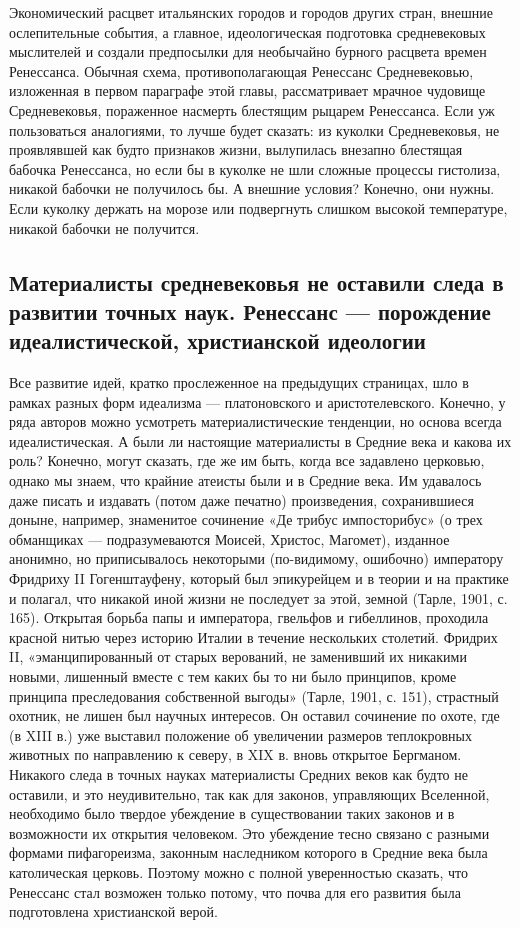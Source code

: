 Экономический расцвет итальянских городов и городов других стран,
внешние ослепительные события, а главное, идеологическая подготовка
средневековых мыслителей и создали предпосылки для необычайно бурного
расцвета времен Ренессанса. Обычная схема, противополагающая Ренессанс
Средневековью, изложенная в первом параграфе этой главы, рассматривает
мрачное чудовище Средневековья, пораженное насмерть блестящим рыцарем
Ренессанса. Если уж пользоваться аналогиями, то лучше будет сказать:
из куколки Средневековья, не проявлявшей как будто признаков жизни,
вылупилась внезапно блестящая бабочка Ренессанса, но если бы в куколке
не шли сложные процессы гистолиза, никакой бабочки не получилось бы. А
внешние условия? Конечно, они нужны. Если куколку держать на морозе
или подвергнуть слишком высокой температуре, никакой бабочки не
получится.

\subsection{Материалисты средневековья не оставили следа в развитии
точных наук. Ренессанс --- порождение идеалистической, христианской
идеологии}

Все развитие идей, кратко прослеженное на предыдущих страницах,
шло в рамках разных форм идеализма --- платоновского и
аристотелевского. Конечно, у ряда авторов можно усмотреть
материалистические тенденции, но основа всегда идеалистическая. А были
ли настоящие материалисты в Средние века и какова их роль? Конечно,
могут сказать, где же им быть, когда все задавлено церковью, однако мы
знаем, что крайние атеисты были и в Средние века. Им удавалось даже
писать и издавать (потом даже печатно) произведения, сохранившиеся
доныне, например, знаменитое сочинение «Де трибус импосторибус» (о
трех обманщиках --- подразумеваются Моисей, Христос, Магомет),
изданное анонимно, но приписывалось некоторыми (по-видимому, ошибочно)
императору Фридриху II Гогенштауфену, который был эпикурейцем и в
теории и на практике и полагал, что никакой иной жизни не последует за
этой, земной (Тарле, 1901, с. 165). Открытая борьба папы и императора,
гвельфов и гибеллинов, проходила красной нитью через историю Италии в
течение нескольких столетий. Фридрих II, «эманципированный от старых
верований, не заменивший их никакими новыми, лишенный вместе с тем
каких бы то ни было принципов, кроме принципа преследования
собственной выгоды» (Тарле, 1901, с. 151), страстный охотник, не лишен
был научных интересов. Он оставил сочинение по охоте, где (в XIII в.)
уже выставил положение об увеличении размеров теплокровных животных по
направлению к северу, в XIX в. вновь открытое Бергманом. Никакого
следа в точных науках материалисты Средних веков как будто не
оставили, и это неудивительно, так как для законов, управляющих
Вселенной, необходимо было твердое убеждение в существовании таких
законов и в возможности их открытия человеком. Это убеждение тесно
связано с разными формами пифагореизма, законным наследником которого
в Средние века была католическая церковь. Поэтому можно с полной
уверенностью сказать, что Ренессанс стал возможен только потому, что
почва для его развития была подготовлена христианской верой.

